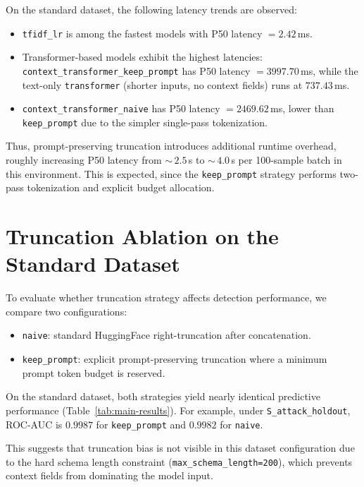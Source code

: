 On the standard dataset, the following latency trends are observed:

\begin{itemize}
    \item \texttt{tfidf\_lr} is among the fastest models with P50 latency $=2.42$\,ms.
    \item Transformer-based models exhibit the highest latencies: \texttt{context\_transformer\_keep\_prompt} has P50 latency $=3997.70$\,ms, while the text-only \texttt{transformer} (shorter inputs, no context fields) runs at $737.43$\,ms.
    \item \texttt{context\_transformer\_naive} has P50 latency $=2469.62$\,ms, lower than \texttt{keep\_prompt} due to the simpler single-pass tokenization.
\end{itemize}

Thus, prompt-preserving truncation introduces additional runtime overhead, roughly increasing P50 latency from ${\sim}\,2.5$\,s to ${\sim}\,4.0$\,s per 100-sample batch in this environment. This is expected, since the \texttt{keep\_prompt} strategy performs two-pass tokenization and explicit budget allocation.

\section{Truncation Ablation on the Standard Dataset}
\label{subsec:truncation_ablation_standard}

To evaluate whether truncation strategy affects detection performance, we compare two configurations:

\begin{itemize}
    \item \texttt{naive}: standard HuggingFace right-truncation after concatenation.
    \item \texttt{keep\_prompt}: explicit prompt-preserving truncation where a minimum prompt token budget is reserved.
\end{itemize}

On the standard dataset, both strategies yield nearly identical predictive performance (Table~\ref{tab:main-results}). For example, under \texttt{S\_attack\_holdout}, ROC-AUC is $0.9987$ for \texttt{keep\_prompt} and $0.9982$ for \texttt{naive}.

This suggests that truncation bias is not visible in this dataset configuration due to the hard schema length constraint (\texttt{max\_schema\_length=200}), which prevents context fields from dominating the model input.

